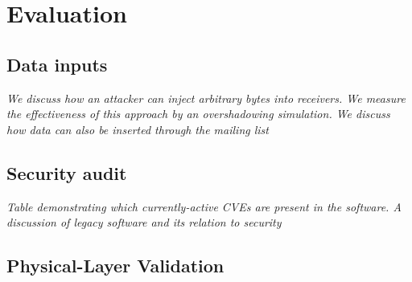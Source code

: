 \section{Evaluation}\label{sec:evaluation}

\subsection{Data inputs}

\textit{We discuss how an attacker can inject arbitrary bytes into receivers.  We measure the effectiveness of this approach by an overshadowing simulation.  We discuss how data can also be inserted through the mailing list}

\subsection{Security audit}
\textit{Table demonstrating which currently-active CVEs are present in the software. A discussion of legacy software and its relation to security}

\subsection{Physical-Layer Validation}\label{sec:physical-layer-validation}

